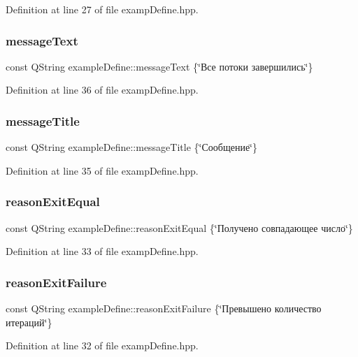 Definition at line 27 of file examp\+Define.\+hpp.

\mbox{\label{namespaceexample_define_a8a0839e0a0b58d9719b0126a7a55872e}} 
\subsubsection{\texorpdfstring{message\+Text}{messageText}}
{\footnotesize\ttfamily const Q\+String example\+Define\+::message\+Text \{\char`\"{}Все потоки завершились\char`\"{}\}}



Definition at line 36 of file examp\+Define.\+hpp.

\mbox{\label{namespaceexample_define_a7b96f153422176efe4415c4c0b9434f6}} 
\subsubsection{\texorpdfstring{message\+Title}{messageTitle}}
{\footnotesize\ttfamily const Q\+String example\+Define\+::message\+Title \{\char`\"{}Сообщение\char`\"{}\}}



Definition at line 35 of file examp\+Define.\+hpp.

\mbox{\label{namespaceexample_define_a9a9c6e2026d7e21a5f91f1247caf2a8a}} 
\subsubsection{\texorpdfstring{reason\+Exit\+Equal}{reasonExitEqual}}
{\footnotesize\ttfamily const Q\+String example\+Define\+::reason\+Exit\+Equal \{\char`\"{}Получено совпадающее число\char`\"{}\}}



Definition at line 33 of file examp\+Define.\+hpp.

\mbox{\label{namespaceexample_define_a89fe16d6ba56c0ba051df9c91896803b}} 
\subsubsection{\texorpdfstring{reason\+Exit\+Failure}{reasonExitFailure}}
{\footnotesize\ttfamily const Q\+String example\+Define\+::reason\+Exit\+Failure \{\char`\"{}Превышено количество итераций\char`\"{}\}}



Definition at line 32 of file examp\+Define.\+hpp.

